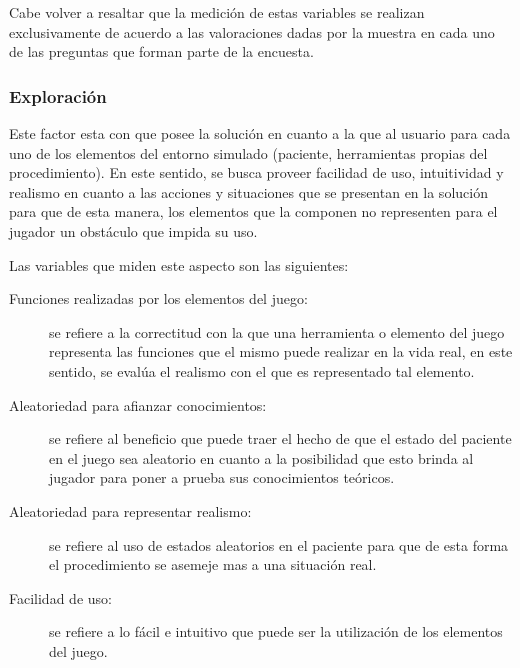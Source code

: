 Cabe volver a resaltar que la medición de estas variables se realizan
exclusivamente de acuerdo a las valoraciones dadas por la muestra en cada uno de
las preguntas que forman parte de la encuesta.

\subsubsection{Exploración}
\label{sec:sub_exploracion}


Este factor esta  con  que posee
la solución en cuanto a la  que  al usuario
para  cada uno de los elementos del entorno simulado
(paciente, herramientas propias del procedimiento). En este sentido, se busca
proveer facilidad de uso, intuitividad y realismo en cuanto a las acciones y
situaciones que se presentan en la solución para que de esta manera, los
elementos que la componen no representen para el jugador un obstáculo que impida
su uso.

Las variables que miden este aspecto son las siguientes:

\begin{description}

\item[Funciones realizadas por los elementos del juego:] se refiere a la
    correctitud con la que una herramienta o elemento del juego representa las
    funciones que el mismo puede realizar en la vida real, en este sentido, se
    evalúa el realismo con el que es representado tal elemento.

\item[Aleatoriedad para afianzar conocimientos:] se refiere al beneficio que
    puede traer el hecho de que el estado del paciente en el juego sea aleatorio
    en cuanto a la posibilidad que esto brinda al jugador para poner a prueba
    sus conocimientos teóricos.

\item[Aleatoriedad para representar realismo:] se refiere al uso de estados
    aleatorios en el paciente para que de esta forma el procedimiento se asemeje
    mas a una situación real.

\item[Facilidad de uso:] se refiere a lo fácil e intuitivo  que puede ser la
    utilización de los elementos del juego.

\end{description}

